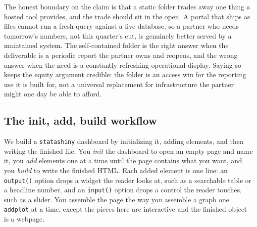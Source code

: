 The honest boundary on the claim is that a static folder trades away one thing a hosted tool provides, and the trade should sit in the open. A portal that ships as files cannot run a fresh query against a live database, so a partner who needs tomorrow's numbers, not this quarter's cut, is genuinely better served by a maintained system. The self-contained folder is the right answer when the deliverable is a periodic report the partner owns and reopens, and the wrong answer when the need is a constantly refreshing operational display. Saying so keeps the equity argument credible: the folder is an access win for the reporting use it is built for, not a universal replacement for infrastructure the partner might one day be able to afford.

\subsection{The init, add, build workflow}
We build a \texttt{statashiny} dashboard by initializing it, adding elements, and then writing the finished file. You \emph{init} the dashboard to open an empty page and name it, you \emph{add} elements one at a time until the page contains what you want, and you \emph{build} to write the finished HTML. Each added element is one line: an \texttt{output()} option drops a widget the reader looks at, such as a searchable table or a headline number, and an \texttt{input()} option drops a control the reader touches, such as a slider. You assemble the page the way you assemble a graph one \texttt{addplot} at a time, except the pieces here are interactive and the finished object is a webpage.


